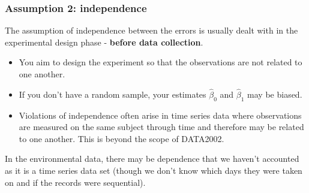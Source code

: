 \documentclass[a4paper]{article}\usepackage[]{graphicx}\usepackage[]{xcolor}
\begin{document}
\subsubsection{Assumption 2: independence}
The assumption of independence between the errors is usually dealt with in the experimental design phase - \textbf{before data collection}.
\begin{itemize}
	\item You aim to design the experiment so that the observations are not related to one another.
	\item If you don't have a random sample, your estimates \( \hat{\beta}_0 \) and \( \hat{\beta}_1 \) may be biased.
	\item Violations of independence often arise in time series data where observations are measured on the same subject through time and therefore may be related to one another. This is beyond the scope of DATA2002.
\end{itemize}
In the environmental data, there may be dependence that we haven't accounted as it is a time series data set (though we don't know which days they were taken on and if the records were sequential).
\end{document}
